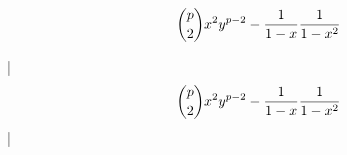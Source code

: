 

\bigskip


$${p \choose 2} x^2 y^{p - 2} - {1 \over 1 - x} {1 \over 1 - x^2}$$

\bigskip

\respuestaS
|$${p \choose 2} x^2 y^{p - 2} - {1 \over 1 - x} {1 \over 1 - x^2}$$|

\bye

